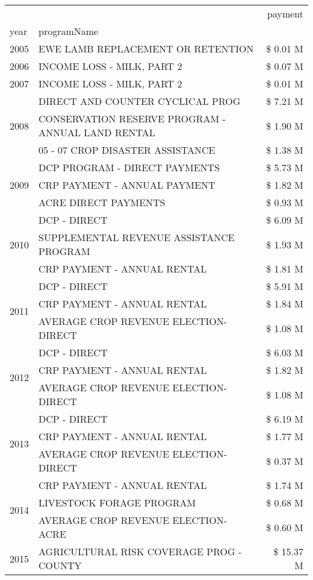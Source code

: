 \begin{tabular}{llr}
\toprule
 &  & payment \\
year & programName &  \\
\midrule
2005 & EWE LAMB REPLACEMENT OR RETENTION & \$ 0.01 M \\
\cline{1-3}
2006 & INCOME LOSS - MILK, PART 2 & \$ 0.07 M \\
\cline{1-3}
2007 & INCOME LOSS - MILK, PART 2 & \$ 0.01 M \\
\cline{1-3}
\multirow[t]{3}{*}{2008} & DIRECT AND COUNTER CYCLICAL PROG & \$ 7.21 M \\
 & CONSERVATION RESERVE PROGRAM - ANNUAL LAND RENTAL & \$ 1.90 M \\
 & 05 - 07 CROP DISASTER ASSISTANCE & \$ 1.38 M \\
\cline{1-3}
\multirow[t]{3}{*}{2009} & DCP PROGRAM - DIRECT PAYMENTS & \$ 5.73 M \\
 & CRP PAYMENT - ANNUAL PAYMENT & \$ 1.82 M \\
 & ACRE DIRECT PAYMENTS & \$ 0.93 M \\
\cline{1-3}
\multirow[t]{3}{*}{2010} & DCP - DIRECT & \$ 6.09 M \\
 & SUPPLEMENTAL REVENUE ASSISTANCE PROGRAM & \$ 1.93 M \\
 & CRP PAYMENT - ANNUAL RENTAL & \$ 1.81 M \\
\cline{1-3}
\multirow[t]{3}{*}{2011} & DCP - DIRECT & \$ 5.91 M \\
 & CRP PAYMENT - ANNUAL RENTAL & \$ 1.84 M \\
 & AVERAGE CROP REVENUE ELECTION-DIRECT & \$ 1.08 M \\
\cline{1-3}
\multirow[t]{3}{*}{2012} & DCP - DIRECT & \$ 6.03 M \\
 & CRP PAYMENT - ANNUAL RENTAL & \$ 1.82 M \\
 & AVERAGE CROP REVENUE ELECTION-DIRECT & \$ 1.08 M \\
\cline{1-3}
\multirow[t]{3}{*}{2013} & DCP - DIRECT & \$ 6.19 M \\
 & CRP PAYMENT - ANNUAL RENTAL & \$ 1.77 M \\
 & AVERAGE CROP REVENUE ELECTION-DIRECT & \$ 0.37 M \\
\cline{1-3}
\multirow[t]{3}{*}{2014} & CRP PAYMENT - ANNUAL RENTAL & \$ 1.74 M \\
 & LIVESTOCK FORAGE PROGRAM & \$ 0.68 M \\
 & AVERAGE CROP REVENUE ELECTION-ACRE & \$ 0.60 M \\
\cline{1-3}
\multirow[t]{3}{*}{2015} & AGRICULTURAL RISK COVERAGE PROG - COUNTY & \$ 15.37 M \\

\end{tabular}

